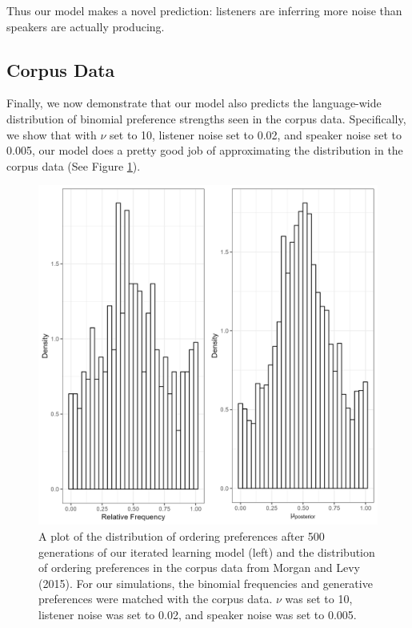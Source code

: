 \documentclass[
  jou,floatsintext]{apa6}
\begin{document}
Thus our model makes a novel prediction: listeners are inferring more noise than speakers are actually producing.

\subsection{Corpus Data}\label{corpus-data}

Finally, we now demonstrate that our model also predicts the language-wide distribution of binomial preference strengths seen in the corpus data. Specifically, we show that with \(\nu\) set to 10, listener noise set to 0.02, and speaker noise set to 0.005, our model does a pretty good job of approximating the distribution in the corpus data (See Figure \ref{fig:corpusourmodel}).



\begin{figure}

{\centering \includegraphics[width=1\linewidth]{Figures/corpus_plot_and_ours} 

}

\caption{A plot of the distribution of ordering preferences after 500 generations of our iterated learning model (left) and the distribution of ordering preferences in the corpus data from Morgan and Levy (2015). For our simulations, the binomial frequencies and generative preferences were matched with the corpus data. \(\nu\) was set to 10, listener noise was set to 0.02, and speaker noise was set to 0.005.}\label{fig:corpusourmodel}
\end{figure}
\end{document}
